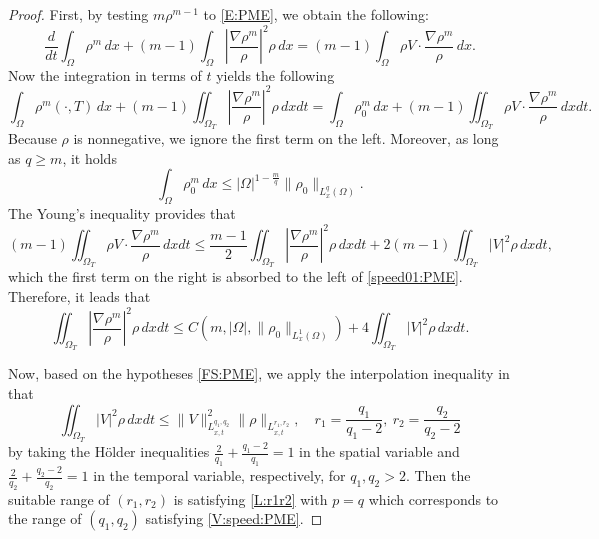 \documentclass{amsart}
\numberwithin{equation}{section}
\newcommand{\abs}[1]{\left| #1 \right|}
\begin{document}
\begin{proof}
First, by testing $m\rho^{m-1}$ to \eqref{E:PME}, we obtain the following:  
\[
 \frac{d}{dt}\int_{\Omega} \rho^m \,dx + (m-1)\int_{\Omega} \left|\frac{\nabla \rho^{m}}{\rho}\right|^2 \rho \, dx 
 = (m-1) \int_{\Omega}  \rho V \cdot \frac{\nabla \rho^m}{\rho} \,dx .
\]
Now the integration in terms of $t$ yields the following
\begin{equation}\label{speed01:PME}
 \int_{\Omega} \rho^m (\cdot, T) \,dx + (m-1)\iint_{\Omega_{T}} \left|\frac{\nabla \rho^{m}}{\rho}\right|^2 \rho \, dx dt
 =  \int_{\Omega} \rho_{0}^{m} \,dx + 
(m-1) \iint_{\Omega_T}  \rho V \cdot \frac{\nabla \rho^m}{\rho} \,dxdt. 
\end{equation}
Because $\rho$ is nonnegative, we ignore the first term on the left. Moreover, as long as $q\geq m$, it holds 
\[
\int_{\Omega} \rho_{0}^{m} \,dx \leq \abs{\Omega}^{1-\frac{m}{q}} \|\rho_0\|_{L^q_x (\Omega)}.
\]
The Young's inequality provides that 
\[
(m-1)\iint_{\Omega_T}  \rho V \cdot \frac{\nabla \rho^m}{\rho} \,dxdt 
\leq  \frac{m-1}{2}\iint_{\Omega_T} \abs{\frac{\nabla \rho^m}{\rho}}^2 \rho \,dxdt + 2(m-1)\iint_{\Omega_T} |V|^2 \rho \,dxdt,
\]
which the first term on the right is absorbed to the left of \eqref{speed01:PME}. Therefore, it leads that
\begin{equation*}\label{speed02:PME}
 \iint_{\Omega_{T}} \left|\frac{\nabla \rho^{m}}{\rho}\right|^2 \rho \, dx dt
 \leq C(m,|\Omega|, \|\rho_0\|_{L^{1}_{x}(\Omega)}) + 
4 \iint_{\Omega_T} \abs{V}^2 \rho  \,dxdt.
\end{equation*}

Now, based on the hypotheses \eqref{FS:PME}, we apply the interpolation inequality in \cite[Lemma~3.2]{HKK02} that  
\[
\iint_{\Omega_{T}} |V|^2 \rho \,dxdt \leq \|V\|^{2}_{L_{x,t}^{q_1, q_2}} \|\rho\|_{L_{x,t}^{r_1, r_2}}, \quad r_1 = \frac{q_1}{q_1 - 2}, \ r_2 = \frac{q_2}{q_2 - 2}
\]
by taking the H\"{o}lder inequalities $\frac{2}{q_1} + \frac{q_1 - 2}{q_1} = 1$ in the spatial variable and $\frac{2}{q_2} + \frac{q_2 - 2}{q_2} = 1$ in the temporal variable, respectively, for $q_1, q_2 > 2$. Then the suitable range of $(r_1, r_2)$ is satisfying \eqref{L:r1r2} with $p=q$ which corresponds to the range of $(q_1, q_2)$ satisfying \eqref{V:speed:PME}.
\end{proof}
\end{document}
